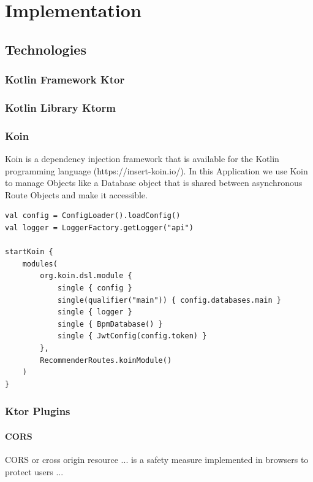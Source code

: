\chapter{Implementation}

\section{Technologies}
\subsection{Kotlin Framework Ktor}

\subsection{Kotlin Library Ktorm}

\subsection{Koin}

Koin is a dependency injection framework that is available for the Kotlin programming language (https://insert-koin.io/). In this Application we use Koin to manage Objects like a Database object that is shared between asynchronous Route Objects and make it accessible.

\begin{verbatim}
val config = ConfigLoader().loadConfig()
val logger = LoggerFactory.getLogger("api")

startKoin {
    modules(
        org.koin.dsl.module {
            single { config }
            single(qualifier("main")) { config.databases.main }
            single { logger }
            single { BpmDatabase() }
            single { JwtConfig(config.token) }
        },
        RecommenderRoutes.koinModule()
    )
}
\end{verbatim}

\subsection{Ktor Plugins}

\subsubsection{CORS}

CORS or cross origin resource ... is a safety measure implemented in browsers to protect users ...

